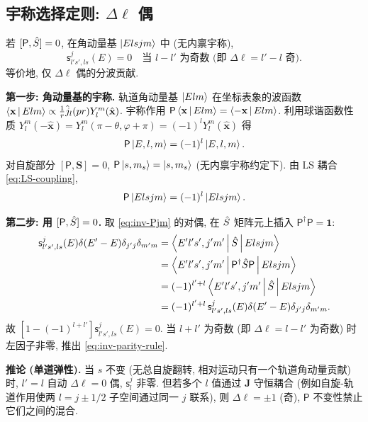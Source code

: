 \subsection{宇称选择定则: \texorpdfstring{$\Delta\ell$}{Delta-l} 偶}\label{sec:inv-parity-rule}

\begin{theorem}[宇称选择定则]\label{thm:inv-parity-rule}
若 $[\mathsf{P},\hat{S}]=0$, 在角动量基 $\ket{Elsjm}$ 中 (无内禀宇称),
\begin{equation}\label{eq:inv-parity-rule}
\mathsf{s}^j_{l's',ls}(E)=0\quad \text{当 }l-l'\text{ 为奇数 (即 }\Delta\ell=l'-l\text{ 奇)}.
\end{equation}
等价地, 仅 $\Delta\ell$ 偶的分波贡献.
\end{theorem}

\begin{proof*}
\textbf{第一步: 角动量基的宇称.}
轨道角动量基 $\ket{Elm}$ 在坐标表象的波函数 $\left\langle \mathbf{x} \,\middle|\, Elm \right\rangle\propto \frac{1}{r}\hat{j}_l(pr)Y_l^m(\hat{\mathbf{x}})$. 宇称作用 $\mathsf{P}\left\langle \mathbf{x} \,\middle|\, Elm \right\rangle=\left\langle -\mathbf{x} \,\middle|\, Elm \right\rangle$. 利用球谐函数性质 $Y_l^m(-\hat{\mathbf{x}})=Y_l^m(\pi-\theta,\varphi+\pi)=(-1)^l Y_l^m(\hat{\mathbf{x}})$ 得
\begin{equation}\label{eq:inv-Plm}
\mathsf{P}\ket{E,l,m}=(-1)^l\ket{E,l,m}.
\end{equation}
对自旋部分 $[\mathsf{P},\mathbf{S}]=0$, $\mathsf{P}\ket{s,m_s}=\ket{s,m_s}$ (无内禀宇称约定下). 由 LS 耦合 \eqref{eq:LS-coupling},
\begin{equation}\label{eq:inv-Pjm}
\mathsf{P}\ket{Elsjm}=(-1)^l\ket{Elsjm}.
\end{equation}

\textbf{第二步: 用 $[\mathsf{P},\hat{S}]=0$.}
取 \eqref{eq:inv-Pjm} 的对偶, 在 $\hat{S}$ 矩阵元上插入 $\mathsf{P}^\dagger \mathsf{P}=\mathbf{1}$:
\begin{align*}
\mathsf{s}^j_{l's',ls}(E)\delta(E'-E)\delta_{j'j}\delta_{m'm}
&=\left\langle E'l's',j'm' \,\middle|\, \hat{S} \,\middle|\, Elsjm \right\rangle\\
&=\left\langle E'l's',j'm' \,\middle|\, \mathsf{P}^\dagger \hat{S} \mathsf{P} \,\middle|\, Elsjm \right\rangle\\
&=(-1)^{l'+l}\left\langle E'l's',j'm' \,\middle|\, \hat{S} \,\middle|\, Elsjm \right\rangle\\
&=(-1)^{l'+l}\,\mathsf{s}^j_{l's',ls}(E)\delta(E'-E)\delta_{j'j}\delta_{m'm}.
\end{align*}
故 $[1-(-1)^{l+l'}]\mathsf{s}^j_{l's',ls}(E)=0$. 当 $l+l'$ 为奇数 (即 $\Delta\ell=l-l'$ 为奇数) 时左因子非零, 推出 \eqref{eq:inv-parity-rule}.

\textbf{推论 (单道弹性).} 当 $s$ 不变 (无总自旋翻转, 相对运动只有一个轨道角动量贡献) 时, $l'=l$ 自动 $\Delta\ell=0$ 偶, $\mathsf{s}^j_l$ 非零. 但若多个 $l$ 值通过 $\mathbf{J}$ 守恒耦合 (例如自旋-轨道作用使两 $l=j\pm 1/2$ 子空间通过同一 $j$ 联系), 则 $\Delta\ell=\pm 1$ (奇), $\mathsf{P}$ 不变性禁止它们之间的混合.
\end{proof*}


